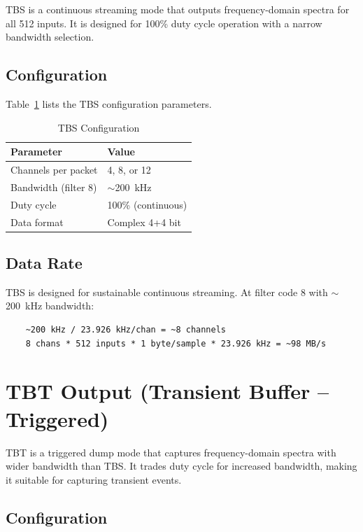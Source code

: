 TBS is a continuous streaming mode that outputs frequency-domain spectra for all 512 inputs. It is designed for 100\% duty cycle operation with a narrow bandwidth selection.

\subsection{Configuration}

Table~\ref{tab:tbs-config} lists the TBS configuration parameters.

\begin{table}[htbp]
    \centering
    \caption{TBS Configuration}
    \label{tab:tbs-config}
    \begin{tabular}{ll}
        \toprule
        \textbf{Parameter} & \textbf{Value} \\
        \midrule
        Channels per packet & 4, 8, or 12 \\
        Bandwidth (filter 8) & $\sim$200~kHz \\
        Duty cycle & 100\% (continuous) \\
        Data format & Complex 4+4 bit \\
        \bottomrule
    \end{tabular}
\end{table}

\subsection{Data Rate}

TBS is designed for sustainable continuous streaming. At filter code 8 with $\sim$200~kHz bandwidth:
\begin{verbatim}
    ~200 kHz / 23.926 kHz/chan = ~8 channels
    8 chans * 512 inputs * 1 byte/sample * 23.926 kHz = ~98 MB/s
\end{verbatim}

\section{TBT Output (Transient Buffer -- Triggered)}

TBT is a triggered dump mode that captures frequency-domain spectra with wider bandwidth than TBS. It trades duty cycle for increased bandwidth, making it suitable for capturing transient events.

\subsection{Configuration}

